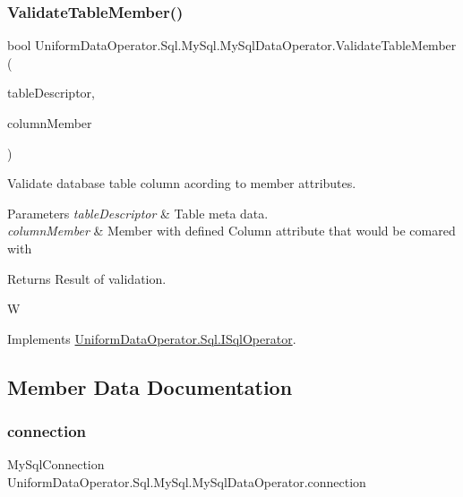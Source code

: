 \subsubsection{\texorpdfstring{Validate\+Table\+Member()}{ValidateTableMember()}}
{\footnotesize\ttfamily bool Uniform\+Data\+Operator.\+Sql.\+My\+Sql.\+My\+Sql\+Data\+Operator.\+Validate\+Table\+Member (\begin{DoxyParamCaption}\item[{\mbox{\hyperlink{class_uniform_data_operator_1_1_sql_1_1_markup_1_1_table_attribute}{Table\+Attribute}}}]{table\+Descriptor,  }\item[{Member\+Info}]{column\+Member }\end{DoxyParamCaption})}



Validate database table column acording to member attributes. 


\begin{DoxyParams}{Parameters}
{\em table\+Descriptor} & Table meta data.\\
\hline
{\em column\+Member} & Member with defined Column attribute that would be comared with \\
\hline
\end{DoxyParams}
\begin{DoxyReturn}{Returns}
Result of validation.
\end{DoxyReturn}
W 

Implements \mbox{\hyperlink{interface_uniform_data_operator_1_1_sql_1_1_i_sql_operator_ac8df6e071646a229acd4781c80d43b68}{Uniform\+Data\+Operator.\+Sql.\+I\+Sql\+Operator}}.



\subsection{Member Data Documentation}
\mbox{\label{class_uniform_data_operator_1_1_sql_1_1_my_sql_1_1_my_sql_data_operator_a807f034631cd8284ecc020d765e6f6f1}} 
\subsubsection{\texorpdfstring{connection}{connection}}
{\footnotesize\ttfamily My\+Sql\+Connection Uniform\+Data\+Operator.\+Sql.\+My\+Sql.\+My\+Sql\+Data\+Operator.\+connection\hspace{0.3cm}{\ttfamily [private]}}



